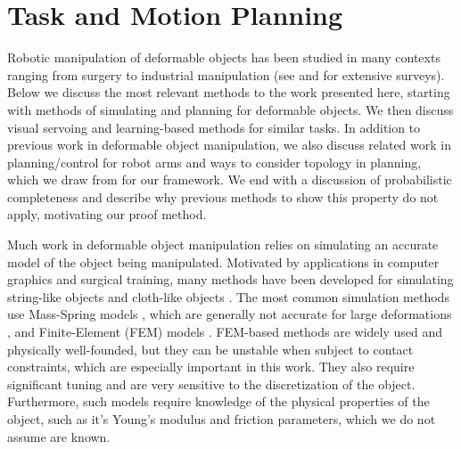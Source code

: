 \section{Task and Motion Planning}

Robotic manipulation of deformable objects has been studied in many contexts ranging from surgery to industrial manipulation (see \cite{Khalil2010} and \cite{Sanchez2018deformablesurvey} for extensive surveys). Below we discuss the most relevant methods to the work presented here, starting with methods of simulating and planning for deformable objects. We then discuss visual servoing and learning-based methods for similar tasks. In addition to previous work in deformable object manipulation, we also discuss related work in planning/control for robot arms and ways to consider topology in planning, which we draw from for our framework. We end with a discussion of probabilistic completeness and describe why previous methods to show this property do not apply, motivating our proof method.

Much work in deformable object manipulation relies on simulating an accurate model of the object being manipulated. Motivated by applications in computer graphics and surgical training, many methods have been developed for simulating string-like objects \citep{Bergou2008,Rungjiratananon2011} and cloth-like objects \citep{Baraff1998,Goldenthal2007}. The most common simulation methods use Mass-Spring models \citep{Gibson1997, Essahbi2012}, which are generally not accurate for large deformations \citep{Maris2010}, and Finite-Element (FEM) models \citep{Muller2002,Irving2004,Kaufmann2008}. FEM-based methods are widely used and physically well-founded, but they can be unstable when subject to contact constraints, which are especially important in this work. They also require significant tuning and are very sensitive to the discretization of the object. Furthermore, such models require knowledge of the physical properties of the object, such as it's Young's modulus and friction parameters, which we do not assume are known.

